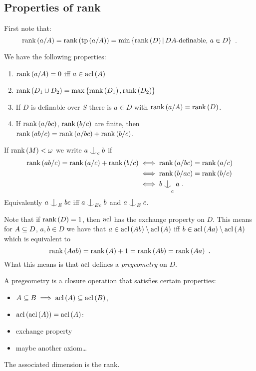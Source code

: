 \documentclass{amsart}
\begin{document}
\subsection{Properties of rank}

First note that:
\begin{equation}
\operatorname{rank}\left(a / A\right) = \operatorname{rank}\left(\operatorname{tp}\left(a / A\right)\right) = 
\min\left\{\operatorname{rank}\left(D\right)\, \middle\vert \, D A\text{-definable, } a\in D\right\} \ .
\end{equation}

We have the following properties:

\begin{enumerate}[label = \numbers.]
\item $\operatorname{rank}\left(a/ A\right) = 0$ iff $a\in \operatorname{acl}\left(A\right)$
\item $\operatorname{rank}\left(D_1 \cup D_2\right) = \max\left\{\operatorname{rank}\left(D_1\right) ,
\operatorname{rank}\left(D_2\right)\right\}$
\item If $D$ is definable over $S$ there is $a\in D$ with $\operatorname{rank}\left(a / A\right) =
\operatorname{rank}\left(D\right)$.
\item If $\operatorname{rank}\left(a / bc\right)$, $\operatorname{rank}\left(b/c\right)$ are finite, then 
$\operatorname{rank}\left(ab/c\right) = \operatorname{rank}\left(a/bc\right) + \operatorname{rank}\left(b/c\right)$.
\end{enumerate}

If $\operatorname{rank}\left(M\right) < \omega$ we write
$a\indfrom_c b$ if
\begin{align}
\rank\left(ab/c\right) = \rank\left(a/c\right)
+ \rank\left(b/c\right) 
&\iff 
\rank\left(a/bc\right) = \rank\left(a/c\right)\\
&\iff 
\rank\left(b/ac\right) = \rank\left(b/c\right)\\
&\iff 
b\indfrom_c a \ .
\end{align}
Equivalently 
$a\indfrom_E bc$ iff $a\indfrom_{Ec} b$ and $a\indfrom_E c$.

Note that if $\operatorname{rank}\left(D\right) = 1$, then $\operatorname{acl}$ has the exchange property on $D$.
This means for $A\subseteq D$, $a,b\in D$ we have that
$a\in \operatorname{acl}\left(Ab\right)\setminus \operatorname{acl}\left(A\right)$ iff
$b\in \operatorname{acl}\left(Aa\right)\setminus \operatorname{acl}\left(A\right)$ which is equivalent to
\begin{equation}
\operatorname{rank}\left(Aab\right) = 
\operatorname{rank}\left(A\right) + 1
= \operatorname{rank}\left(Ab\right) = \operatorname{rank}\left(Aa\right)\ . 
\end{equation}
What this means is that $\operatorname{acl}$ defines a \emph{pregeometry} on $D$.

A pregeometry is a closure operation that satisfies certain properties:
\begin{itemize}
\item $A\subseteq B \implies \operatorname{acl}\left(A\right)\subseteq \operatorname{acl}\left(B\right)$,
\item $\operatorname{acl}\left(\operatorname{acl}\left(A\right)\right) = \operatorname{acl}\left(A\right)$:
\item exchange property
\item maybe another axiom\ldots
\end{itemize}
The associated dimension is the rank.
\end{document}
